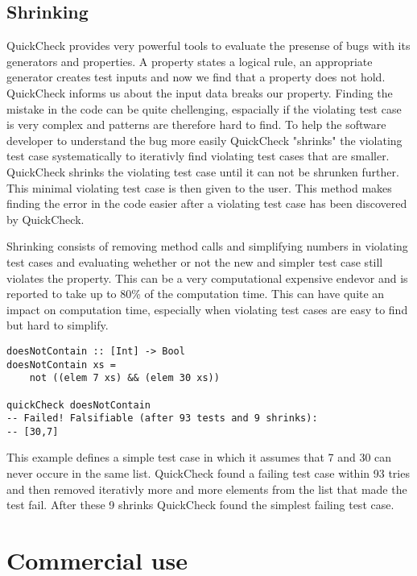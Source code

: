 \documentclass[a4paper, 12pt]{article} %
\begin{document}
\subsection{Shrinking}

QuickCheck provides very powerful tools to evaluate the presense of bugs with its generators and properties. A property states a logical rule, an appropriate generator creates test inputs and now we find that a property does not hold. QuickCheck informs us about the input data breaks our property. Finding the mistake in the code can be quite chellenging, espacially if the violating test case is very complex and patterns are therefore hard to find. To help the software developer to understand the bug more easily QuickCheck "shrinks" the violating test case systematically to iterativly find violating test cases that are smaller. QuickCheck shrinks the violating test case until it can not be shrunken further. This minimal violating test case is then given to the user. This method makes finding the error in the code easier after a violating test case has been discovered by QuickCheck. \cite{Claessen2009}

Shrinking consists of removing method calls and simplifying numbers in violating test cases and evaluating wehether or not the new and simpler test case still violates the property. This can be a very computational expensive endevor and is reported to take up to 80\% of the computation time. This can have quite an impact on computation time, especially when violating test cases are easy to find but hard to simplify. \cite{Hughes:2016}

\begin{verbatim}
doesNotContain :: [Int] -> Bool
doesNotContain xs = 
    not ((elem 7 xs) && (elem 30 xs))

quickCheck doesNotContain
-- Failed! Falsifiable (after 93 tests and 9 shrinks):
-- [30,7]
\end{verbatim}

This example defines a simple test case in which it assumes that 7 and 30 can never occure in the same list. QuickCheck found a failing test case within 93 tries and then removed iterativly more and more elements from the list that made the test fail. After these 9 shrinks QuickCheck found the simplest failing test case.

\section{Commercial use}
\end{document}
